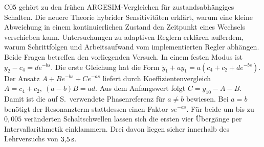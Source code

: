 C05 gehört zu den frühen ARGESIM-Vergleichen für zustandsabhängiges Schalten. Die neuere Theorie hybrider Sensitivitäten erklärt, warum eine kleine Abweichung in einem kontinuierlichen Zustand den Zeitpunkt eines Wechsels verschieben kann. Untersuchungen zu adaptiven Reglern erklären außerdem, warum Schrittfolgen und Arbeitsaufwand vom implementierten Regler abhängen. Beide Fragen betreffen den vorliegenden Versuch.
In einem festen Modus ist \(y_2-c_4=d e^{-bs}\). Die erste Gleichung hat die Form \(\dot y_1+ay_1=a(c_4+c_2+d e^{-bs})\). Der Ansatz \(A+B e^{-bs}+C e^{-as}\) liefert durch Koeffizientenvergleich \(A=c_4+c_2,\ (a-b)B=ad\). Aus dem Anfangswert folgt \(C=y_{10}-A-B\). Damit ist die auf S.\, verwendete Phasenreferenz für \(a\ne b\) bewiesen. Bei \(a=b\) benötigt der Resonanzterm stattdessen einen Faktor \(s e^{-as}\).
Für beide um bis zu \(0{,}005\) veränderten Schaltschwellen lassen sich die ersten vier Übergänge per Intervallarithmetik einklammern. Drei davon liegen sicher innerhalb des Lehrversuchs von \(3{,}5\,\mathrm{s}\).
